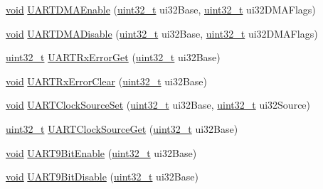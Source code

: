 \begin{DoxyCompactItemize}
\hyperlink{usb__devapi_8h_afabf60e7f57651d6d595a02c75f07cd0}{void} \hyperlink{group__uart__api_gaac1b6edea28af97be22f5f788312145b}{U\+A\+R\+T\+D\+M\+A\+Enable} (\hyperlink{_p_e___types_8h_a33594304e786b158f3fb30289278f5af}{uint32\+\_\+t} ui32\+Base, \hyperlink{_p_e___types_8h_a33594304e786b158f3fb30289278f5af}{uint32\+\_\+t} ui32\+D\+M\+A\+Flags)
\item 
\hyperlink{usb__devapi_8h_afabf60e7f57651d6d595a02c75f07cd0}{void} \hyperlink{group__uart__api_ga858997600c2e00c63711a340770d2d63}{U\+A\+R\+T\+D\+M\+A\+Disable} (\hyperlink{_p_e___types_8h_a33594304e786b158f3fb30289278f5af}{uint32\+\_\+t} ui32\+Base, \hyperlink{_p_e___types_8h_a33594304e786b158f3fb30289278f5af}{uint32\+\_\+t} ui32\+D\+M\+A\+Flags)
\item 
\hyperlink{_p_e___types_8h_a33594304e786b158f3fb30289278f5af}{uint32\+\_\+t} \hyperlink{group__uart__api_gadc2c2c4a69942640cdf3334a35e90c23}{U\+A\+R\+T\+Rx\+Error\+Get} (\hyperlink{_p_e___types_8h_a33594304e786b158f3fb30289278f5af}{uint32\+\_\+t} ui32\+Base)
\item 
\hyperlink{usb__devapi_8h_afabf60e7f57651d6d595a02c75f07cd0}{void} \hyperlink{group__uart__api_ga68600e26bbe630602ed674190259d74c}{U\+A\+R\+T\+Rx\+Error\+Clear} (\hyperlink{_p_e___types_8h_a33594304e786b158f3fb30289278f5af}{uint32\+\_\+t} ui32\+Base)
\item 
\hyperlink{usb__devapi_8h_afabf60e7f57651d6d595a02c75f07cd0}{void} \hyperlink{group__uart__api_ga9aa412a7fe9755f7f7e3e98c95a44ef7}{U\+A\+R\+T\+Clock\+Source\+Set} (\hyperlink{_p_e___types_8h_a33594304e786b158f3fb30289278f5af}{uint32\+\_\+t} ui32\+Base, \hyperlink{_p_e___types_8h_a33594304e786b158f3fb30289278f5af}{uint32\+\_\+t} ui32\+Source)
\item 
\hyperlink{_p_e___types_8h_a33594304e786b158f3fb30289278f5af}{uint32\+\_\+t} \hyperlink{group__uart__api_gaa9f25b4ba8b610bb0aa0b2090b6b2cd3}{U\+A\+R\+T\+Clock\+Source\+Get} (\hyperlink{_p_e___types_8h_a33594304e786b158f3fb30289278f5af}{uint32\+\_\+t} ui32\+Base)
\item 
\hyperlink{usb__devapi_8h_afabf60e7f57651d6d595a02c75f07cd0}{void} \hyperlink{group__uart__api_gaa6c67f6e29e12e6ec879e4a0c47ccf6f}{U\+A\+R\+T9\+Bit\+Enable} (\hyperlink{_p_e___types_8h_a33594304e786b158f3fb30289278f5af}{uint32\+\_\+t} ui32\+Base)
\item 
\hyperlink{usb__devapi_8h_afabf60e7f57651d6d595a02c75f07cd0}{void} \hyperlink{group__uart__api_ga0ad87ddcc9c6669238817943349bd1e0}{U\+A\+R\+T9\+Bit\+Disable} (\hyperlink{_p_e___types_8h_a33594304e786b158f3fb30289278f5af}{uint32\+\_\+t} ui32\+Base)

\end{DoxyCompactItemize}
